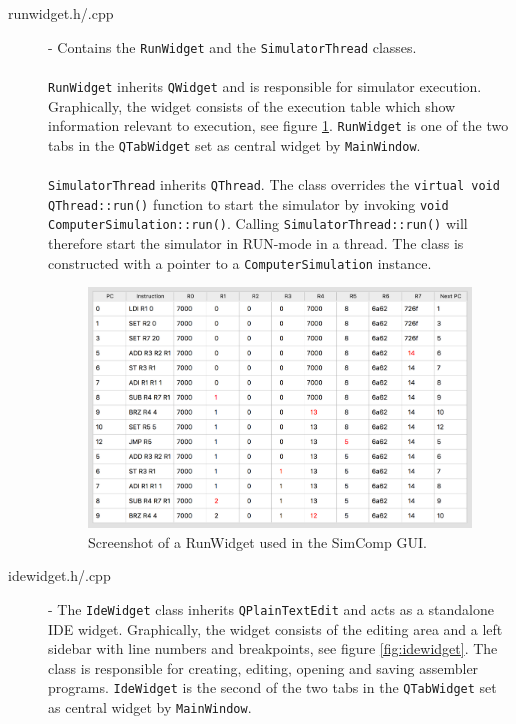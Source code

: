 \begin{description}
\item [runwidget.h/.cpp] - Contains the \texttt{RunWidget} and the \texttt{SimulatorThread} classes. \\ \\ \texttt{RunWidget} inherits \texttt{QWidget} and is responsible for simulator execution. Graphically, the widget consists of the execution table
which show information relevant to execution, see figure \ref{fig:runwidget}. \texttt{RunWidget} is one of the two tabs in the \texttt{QTabWidget} set as central widget by \texttt{MainWindow}. \\ \\
\texttt{SimulatorThread} inherits \texttt{QThread}. The class overrides the \texttt{virtual void QThread::run()} function to start the simulator by invoking \texttt{void ComputerSimulation::run()}. Calling \texttt{SimulatorThread::run()} will therefore start the simulator in RUN-mode in a thread. The class is constructed with a pointer to a \texttt{ComputerSimulation} instance.

\begin{figure}[H]
\centering
\includegraphics[scale=0.35]{img/RunWidget.png}
\caption{Screenshot of a RunWidget used in the SimComp GUI.}
\label{fig:runwidget}
\end{figure}


\item [idewidget.h/.cpp] - The \texttt{IdeWidget} class inherits \texttt{QPlainTextEdit} and acts as a standalone {IDE} widget. Graphically, the widget consists of the editing area and a left sidebar with line numbers and breakpoints, see figure \ref{fig:idewidget}. The class is responsible for creating, editing, opening and saving assembler programs. \texttt{IdeWidget} is the second of the two tabs in the \texttt{QTabWidget} set as central widget by \texttt{MainWindow}.


\end{description}
